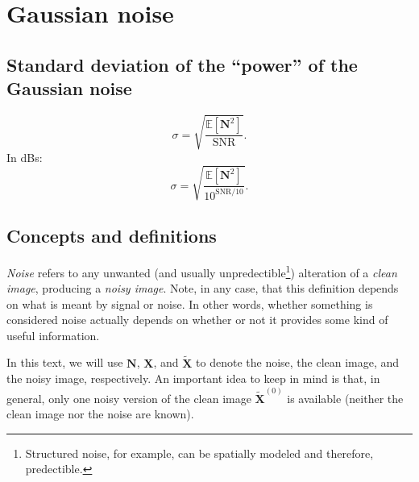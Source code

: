 \chapter{Gaussian noise}

\section{Standard deviation of the ``power'' of the Gaussian noise}
\begin{equation}
  \sigma = \sqrt{\frac{\mathbb{E}[\bm{N}^2]}{\text{SNR}}}.
\end{equation}
In dBs:
\begin{equation}
  \sigma = \sqrt{\frac{\mathbb{E}[\bm{N}^2]}{10^{\text{SNR}/10}}}.
\end{equation}


\section{Concepts and definitions}

\emph{Noise} refers to any unwanted (and usually
unpredectible\footnote{Structured noise, for example, can be spatially
  modeled and therefore, predectible.}) alteration of a \emph{clean
  image}, producing a \emph{noisy image}. Note, in any case, that this
definition depends on what is meant by signal or noise. In other
words, whether something is considered noise actually depends on
whether or not it provides some kind of useful information.

In this text, we will use $\bm{N}$, $\bm{X}$, and $\tilde{\bm{X}}$ to denote the
noise, the clean image, and the noisy image, respectively. An
important idea to keep in mind is that, in general, only one noisy
version of the clean image $\tilde{\bm{X}}^{(0)}$ is available (neither
the clean image nor the noise are known).

